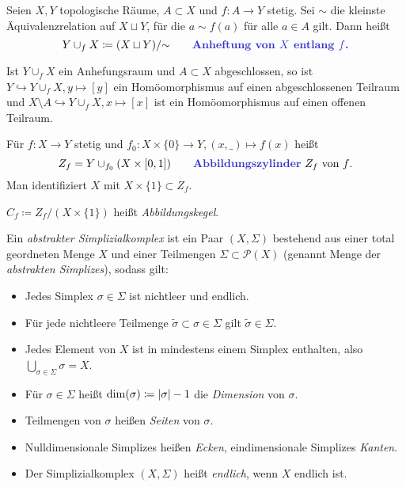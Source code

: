 \documentclass{cheat-sheet}
\begin{document}
\begin{defn}
  Seien $X, Y$ topologische Räume, $A \subset X$ und $f : A \to Y$ stetig. Sei ${\sim}$ die kleinste Äquivalenzrelation auf $X \sqcup Y$, für die $a \sim f(a)$ für alle $a \in A$ gilt. Dann heißt
  \[
    Y \cup_f X \coloneqq (X \sqcup Y) / {\sim}
    \qquad \text{\emph{Anheftung von $X$ entlang $f$.}}
  \]
\end{defn}

\begin{prop}
  Ist $Y \cup_f X$ ein Anhefungsraum und $A \subset X$ abgeschlossen, so ist $Y \hookrightarrow Y \cup_f X, y \mapsto [y]$ ein Homöomorphismus auf einen abgeschlossenen Teilraum und $X \setminus A \hookrightarrow Y \cup_f X, x \mapsto [x]$ ist ein Homöomorphismus auf einen offenen Teilraum.
\end{prop}

\begin{defn}
  Für $f : X \to Y$ stetig und $f_0 : X \times \{ 0 \} \to Y, (x, \_) \mapsto f(x)$ heißt
  \[
    Z_f = Y \cup_{f_0} (X \times \cinterval{0}{1})
    \qquad \text{\emph{Abbildungszylinder} $Z_f$ von $f$.}
  \]
  Man identifiziert $X$ mit $X \times \{ 1 \} \subset Z_f$.
\end{defn}

\begin{defn}
  $C_f \coloneqq Z_f / (X \times \{ 1 \})$ heißt \emph{Abbildungskegel}.
\end{defn}

\begin{defn}
  Ein \emph{abstrakter Simplizialkomplex} ist ein Paar $(X, \Sigma)$ bestehend aus einer total geordneten Menge $X$ und einer Teilmengen $\Sigma \subset \mathcal{P}(X)$ (genannt Menge der \emph{abstrakten Simplizes}), sodass gilt:
  \begin{itemize}
    \item Jedes Simplex $\sigma \in \Sigma$ ist nichtleer und endlich.
    \item Für jede nichtleere Teilmenge $\tilde{\sigma} \subset \sigma \in \Sigma$ gilt $\tilde{\sigma} \in \Sigma$.
    \item Jedes Element von $X$ ist in mindestens einem Simplex enthalten, also $\bigcup_{\sigma \in \Sigma} \sigma = X$.
  \end{itemize}
\end{defn}

\begin{defn}
  \begin{itemize}
    \item Für $\sigma \in \Sigma$ heißt $\dim(\sigma) \coloneqq \lvert\sigma\rvert - 1$ die \emph{Dimension} von $\sigma$.
    \item Teilmengen von $\sigma$ heißen \emph{Seiten} von $\sigma$.
    \item Nulldimensionale Simplizes heißen \emph{Ecken}, eindimensionale Simplizes \emph{Kanten}.
    \item Der Simplizialkomplex $(X, \Sigma)$ heißt \emph{endlich}, wenn $X$ endlich ist.
  \end{itemize}
\end{defn}
\end{document}
